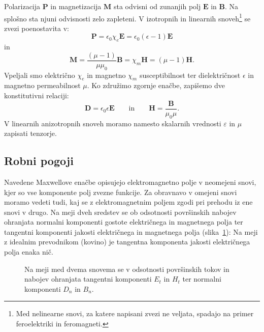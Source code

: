 Polarizacija $\mathbf{P}$ in magnetizacija $\mathbf{M}$ sta odvisni od zunanjih polj $\mathbf{E}$
in $\mathbf{B}$. Na splošno sta njuni odvisnosti zelo zapleteni.
V izotropnih in linearnih snoveh\footnote{Med nelinearne snovi, za katere
napisani zvezi ne veljata, spadajo na primer feroelektriki in feromagneti.}
 se zvezi poenostavita v:
\begin{equation}
\mathbf{P}=\epsilon_{0}\chi_e\mathbf{E} = \epsilon_{0}(\epsilon-1)\mathbf{E} 
\label{eq:PM}
\end{equation}
in
\begin{equation}
\mathbf{M}=\frac{(\mu-1)}{\mu\mu_0}\mathbf{B} = \chi_m \mathbf{H} = (\mu-1)\mathbf{H}.
\end{equation}
Vpeljali smo  električno $\chi_e$ in 
magnetno $\chi_m$ susceptibilnost ter
dielektričnost $\epsilon$ in
magnetno permeabilnost $\mu$. Ko združimo zgornje
enačbe, zapišemo dve konstitutivni
relaciji:
\begin{equation}
\mathbf{D}  =\epsilon_{0}\epsilon\mathbf{E}\qquad \textrm{in} 
\qquad
\mathbf{H}  =\frac{\mathbf{B}}{\mu_{0}\mu}.
\end{equation}
V linearnih anizotropnih snoveh moramo namesto skalarnih vrednosti $\varepsilon$
in $\mu$ zapisati tenzorje. 

\subsection*{Robni pogoji}
Navedene Maxwellove enačbe opisujejo elektromagnetno polje
v neomejeni snovi, kjer so vse komponente polj zvezne funkcije. Za
obravnavo v omejeni snovi moramo vedeti tudi, kaj se z elektromagnetnim
poljem zgodi pri prehodu iz ene snovi v drugo.
Na meji dveh sredstev se ob odsotnosti površinskih nabojev ohranjata 
normalni komponenti gostote električnega in magnetnega polja 
ter tangentni komponenti jakosti
električnega in magnetnega polja (slika~\ref{fig:Robni-pogoji}):
Na meji z idealnim prevodnikom (kovino) je tangentna komponenta
jakosti električnega polja enaka nič.

\begin{figure}[ht]
\centering
  \def\svgwidth{85truemm} 
  
\caption{Na meji med dvema snovema se v odsotnosti površinskih tokov
in nabojev ohranjata tangentni komponenti $E_t$ in $H_t$ ter 
normalni komponenti $D_n$ in $B_n$.}
\label{fig:Robni-pogoji}
\end{figure}

